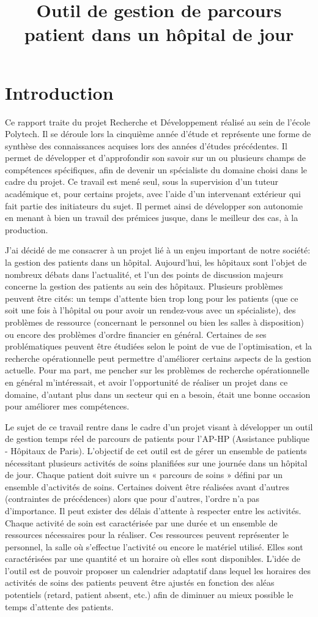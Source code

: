\documentclass[noposter]{polytech/polytech}
\title{Outil de gestion de parcours patient dans un hôpital de jour}
\begin{document}
\chapter*{Introduction}

Ce rapport traite du projet Recherche et Développement réalisé au sein de l'école Polytech. Il se déroule lors la cinquième année d'étude et représente une forme de synthèse des connaissances acquises lors des années d'études précédentes. Il permet de développer et d'approfondir son savoir sur un ou plusieurs champs de compétences spécifiques, afin de devenir un spécialiste du domaine choisi dans le cadre du projet. Ce travail est mené seul, sous la supervision d'un tuteur académique et, pour certains projets, avec l'aide d'un intervenant extérieur qui fait partie des initiateurs du sujet. Il permet ainsi de développer son autonomie en menant à bien un travail des prémices jusque, dans le meilleur des cas, à la production.

J'ai décidé de me consacrer à un projet lié à un enjeu important de notre société: la gestion des patients dans un hôpital. Aujourd'hui, les hôpitaux sont l'objet de nombreux débats dans l'actualité, et l'un des points de discussion majeurs concerne la gestion des patients au sein des hôpitaux. Plusieurs problèmes peuvent être cités: un temps d'attente bien trop long pour les patients (que ce soit une fois à l'hôpital ou pour avoir un rendez-vous avec un spécialiste), des problèmes de ressource (concernant le personnel ou bien les salles à disposition) ou encore des problèmes d'ordre financier en général. Certaines de ses problématiques peuvent être étudiées selon le point de vue de l'optimisation, et la recherche opérationnelle peut permettre d'améliorer certains aspects de la gestion actuelle. Pour ma part, me pencher sur les problèmes de recherche opérationnelle en général m'intéressait, et avoir l'opportunité de réaliser un projet dans ce domaine, d'autant plus dans un secteur qui en a besoin, était une bonne occasion pour améliorer mes compétences.

Le sujet de ce travail rentre dans le cadre d'un projet visant à développer un outil de gestion temps réel de parcours de patients pour l’AP-HP (Assistance publique - Hôpitaux de Paris). L'objectif de cet outil est de gérer un ensemble de patients nécessitant plusieurs activités de soins planifiées sur une journée dans un hôpital de jour. Chaque patient doit suivre un « parcours de soins » défini par un ensemble d'activités de soins. Certaines doivent être réalisées avant d'autres (contraintes de précédences) alors que pour d'autres, l'ordre n'a pas d'importance. Il peut exister des délais d'attente à respecter entre les activités. Chaque activité de soin est caractérisée par une durée et un ensemble de ressources nécessaires pour la réaliser. Ces ressources peuvent représenter le personnel, la salle où s'effectue l'activité ou encore le matériel utilisé. Elles sont caractérisées par une quantité et un horaire où elles sont disponibles. L'idée de l'outil est de pouvoir proposer un calendrier adaptatif dans lequel les horaires des activités de soins des patients peuvent être ajustés en fonction des aléas potentiels (retard, patient absent, etc.) afin de diminuer au mieux possible le temps d'attente des patients.
\end{document}
